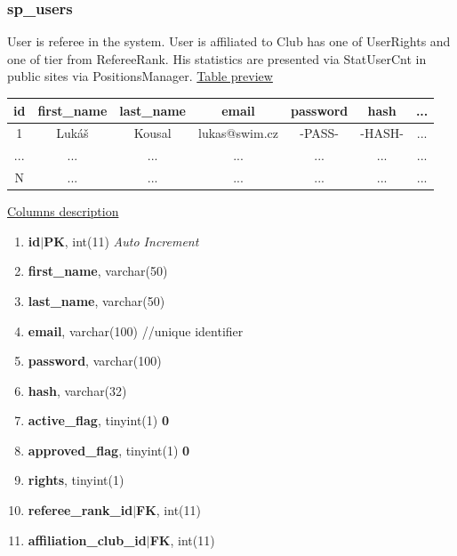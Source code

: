 \subsubsection*{sp\_users}
User is referee in the system. User is affiliated to Club has one of UserRights and one of tier from RefereeRank. His statistics are presented via StatUserCnt in public sites via PositionsManager.
\newline
\underline{Table preview}
\begin{center}
  \begin{tabular}{||c c c c c c c||} 
  \hline
  id & first\_name & last\_name & email & password & hash & ... \\ [0.5ex] 
  \hline\hline
  1 & Lukáš & Kousal & lukas@swim.cz & -PASS- & -HASH- & ... \\ 
  \hline
  ... & ... & ... & ... & ... & ... & ... \\
  \hline
  N & ... & ... & ... & ... & ... & ... \\ 
  \hline
 \end{tabular}
 \end{center}
 \underline{Columns description}
 \begin{enumerate}
   \setlength\itemsep{0em}
   \item \textbf{id$|$PK}, int(11) \textit{Auto Increment}
   \item \textbf{first\_name}, varchar(50)
   \item \textbf{last\_name}, varchar(50)
   \item \textbf{email}, varchar(100) //unique identifier
   \item \textbf{password}, varchar(100)
   \item \textbf{hash}, varchar(32)
   \item \textbf{active\_flag}, tinyint(1) \lbrack \textbf{0}\rbrack 
   \item \textbf{approved\_flag}, tinyint(1) \lbrack \textbf{0}\rbrack 
   \item \textbf{rights}, tinyint(1)
   \item \textbf{referee\_rank\_id$|$FK}, int(11)
   \item \textbf{affiliation\_club\_id$|$FK}, int(11)
\end{enumerate}

